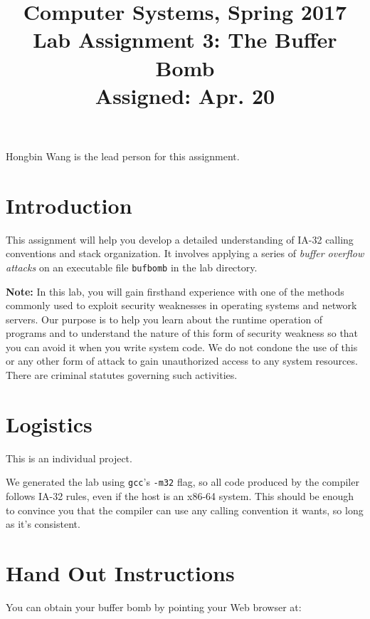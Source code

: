 \documentclass[11pt]{article}
\begin{document}
\title{Computer Systems, Spring 2017\\
Lab Assignment 3: The Buffer Bomb\\
Assigned: Apr. 20
}

\author{}
\date{}

\maketitle



Hongbin Wang is the lead person for
this assignment.


\section*{Introduction}

This assignment will help you develop a detailed understanding of
IA-32 calling conventions and stack organization.  It involves
applying a series of {\em buffer overflow attacks} on an executable
file {\tt bufbomb} in the lab directory.

{\bf Note:} In this lab, you will gain firsthand experience with one
of the methods commonly used to exploit security weaknesses in
operating systems and network servers.  Our purpose is to help you
learn about the runtime operation of programs and to understand the
nature of this form of security weakness so that you can avoid it when
you write system code.  We do not condone the use of this or any other
form of attack to gain unauthorized access to any system resources.
There are criminal statutes governing such activities. 


\section*{Logistics}

This is an individual project.

We generated the lab using {\tt gcc}'s {\tt -m32} flag, so all code
produced by the compiler follows IA-32 rules, even if the host is an
x86-64 system. This should be enough to convince you that the compiler
can use any calling convention it wants, so long as it's consistent.


\section*{Hand Out Instructions}

You can obtain your buffer bomb by pointing your Web browser at:
\end{document}
